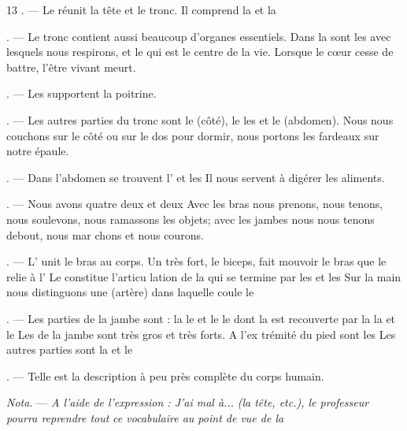 \begin{VUpage}[15]{13}
. --- Le  réunit la tête et le tronc. Il comprend\nl
la  et la 

. --- Le tronc contient aussi beaucoup d'organes\nl
essentiels. Dans la  sont les  avec\nl
lesquels nous respirons, et le  qui est le centre\nl
de la vie. Lorsque le cœur cesse de battre, l'être\nl
vivant meurt.

. --- Les  supportent la poitrine.

. --- Les autres parties du tronc sont le \nl
(côté), le  les  et le  (abdomen).\nl
Nous nous couchons sur le côté ou sur le dos pour\nl
dormir, nous portons les fardeaux sur notre épaule.

. --- Dans l'abdomen se trouvent l' et\nl
les  Il nous servent à digérer les aliments.

. --- Nous avons quatre  deux \nl
et deux  Avec les bras nous prenons, nous\nl
tenons, nous soulevons, nous ramassons les objets;\nl
avec les jambes nous nous tenons debout, nous mar\cc
chons et nous courons.

. --- L' unit le bras au corps. Un \nl
très fort, le biceps, fait mouvoir le bras que le \nl
relie à l' Le  constitue l'articu\cc
lation de la  qui se termine par les  et\nl
les  Sur la main nous distinguons une \nl
(artère) dans laquelle coule le 

. --- Les parties de la jambe sont : la  le\nl
{} et le  le  dont la  est\nl
recouverte par la  la  et le  Les\nl
{} de la jambe sont très gros et très forts. A l'ex\cc
trémité du pied sont les  Les autres\nl
parties sont la  et le 

. --- Telle est la description à peu près complète\nl
du corps humain.

\VUblancAlinea
\textit{Nota.} --- \textit{A l'aide de l'expression : J'ai mal à...}\nl
\textit{(la tête, etc.), le professeur pourra reprendre tout}\nl
\textit{ce vocabulaire au point de vue de la} 
\end{VUpage}

